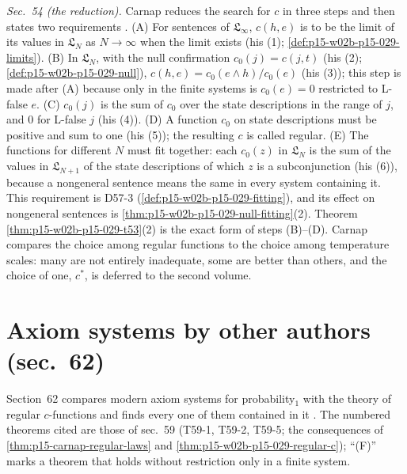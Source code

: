 \emph{Sec.~54 (the reduction).} Carnap reduces the search for \(c\) in
three steps and then states two requirements
\cite[sec.~54, pp.~287--292]{Carnap1950Probability}. (A) For sentences
of \(\mathfrak L_\infty\), \(c(h,e)\) is to be the limit of its values
in \(\mathfrak L_N\) as \(N\to\infty\) when the limit exists (his (1);
\cref{def:p15-w02b-p15-029-limits}). (B) In \(\mathfrak L_N\), with the
null confirmation \(c_0(j)=c(j,t)\) (his (2);
\cref{def:p15-w02b-p15-029-null}), \(c(h,e)=c_0(e\land h)/c_0(e)\) (his
(3)); this step is made after (A) because only in the finite systems is
\(c_0(e)=0\) restricted to L-false \(e\). (C) \(c_0(j)\) is the sum of
\(c_0\) over the state descriptions in the range of \(j\), and \(0\)
for L-false \(j\) (his (4)). (D) A function \(c_0\) on state
descriptions must be positive and sum to one (his (5)); the resulting
\(c\) is called regular. (E) The functions for different \(N\) must fit
together: each \(c_0(z)\) in \(\mathfrak L_N\) is the sum of the values
in \(\mathfrak L_{N+1}\) of the state descriptions of which \(z\) is a
subconjunction (his (6)), because a nongeneral sentence means the same
in every system containing it. This requirement is D57-3
(\cref{def:p15-w02b-p15-029-fitting}), and its effect on nongeneral
sentences is \cref{thm:p15-w02b-p15-029-null-fitting}(2). Theorem
\ref{thm:p15-w02b-p15-029-t53}(2) is the exact form of steps (B)--(D).
Carnap compares the choice among regular functions to the choice among
temperature scales: many are not entirely inadequate, some are better
than others, and the choice of one, \(c^*\), is deferred to the second
volume.

\section{Axiom systems by other authors (sec.~62)}
\label{sec:p15-w02b-p15-029-axiom-systems}

Section~62 compares modern axiom systems for probability\(_1\) with the
theory of regular \(c\)-functions and finds every one of them contained
in it \cite[sec.~62, pp.~337--345]{Carnap1950Probability}. The numbered
theorems cited are those of sec.~59 (T59-1, T59-2, T59-5; the
consequences of \cref{thm:p15-carnap-regular-laws} and
\cref{thm:p15-w02b-p15-029-regular-c}); ``(F)'' marks a theorem that
holds without restriction only in a finite system.

